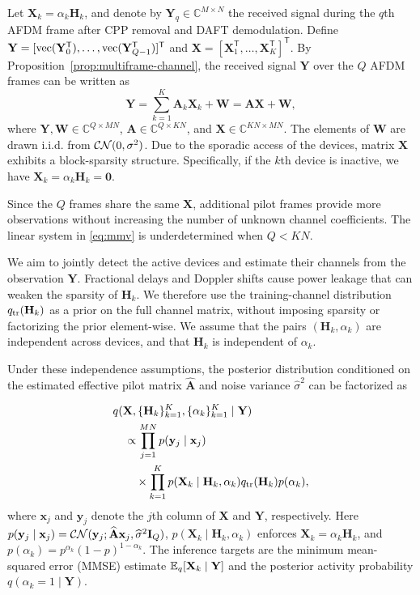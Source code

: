 Let $\mathbf X_k=\alpha_k\mathbf H_k$, and denote by
$\mathbf Y_q\in\mathbb C^{M\times N}$ the received signal during the
$q$th AFDM frame after CPP removal and DAFT demodulation. Define
$\mathbf Y=[\operatorname{vec}(\mathbf Y_0^{\mathsf T}),\ldots,
\operatorname{vec}(\mathbf Y_{Q-1}^{\mathsf T})]^{\mathsf T}$ and
$\mathbf X=[\mathbf X_1^{\mathsf T},\ldots,
\mathbf X_K^{\mathsf T}]^{\mathsf T}$. By
Proposition~\ref{prop:multiframe-channel}, the received signal $\mathbf Y$
over the $Q$ AFDM frames can be written as
\begin{equation}
 \mathbf Y=\sum_{k=1}^K\mathbf A_k\mathbf X_k+\mathbf W
 =\mathbf A\mathbf X+\mathbf W,
 \label{eq:mmv}
\end{equation}
where $\mathbf Y,\mathbf W\in\mathbb C^{Q\times MN}$,
$\mathbf A\in\mathbb C^{Q\times KN}$, and
$\mathbf X\in\mathbb C^{KN\times MN}$.
The elements of $\mathbf W$ are drawn i.i.d. from $\mathcal{CN}(0,\sigma^2)$.
Due to the sporadic access of the devices, matrix $\mathbf X$ exhibits
a block-sparsity structure. Specifically, if the $k$th device is
inactive, we have $\mathbf X_k=\alpha_k\mathbf H_k=\mathbf0$.

Since the $Q$ frames share the same $\mathbf X$, additional pilot frames
provide more observations without increasing the number of unknown
channel coefficients. The linear system in \eqref{eq:mmv} is
underdetermined when $Q<KN$.

We aim to jointly detect the active devices and estimate their channels
from the observation $\mathbf Y$. Fractional delays and Doppler
shifts cause power leakage that can weaken the sparsity of $\mathbf H_k$.
We therefore use the training-channel distribution
$q_{\rm tr}(\mathbf H_k)$ as a prior on the full channel matrix,
without imposing sparsity or factorizing the prior element-wise.
We assume that the pairs $(\mathbf H_k,\alpha_k)$ are independent
across devices, and that $\mathbf H_k$ is independent of $\alpha_k$.

Under these independence assumptions, the posterior distribution
conditioned on the estimated effective pilot matrix $\widehat{\mathbf A}$
and noise variance $\widehat\sigma^2$ can be factorized as

\begin{equation}
 \begin{aligned}
 &q(\mathbf X,\{\mathbf H_k\}_{k=1}^{K},\{\alpha_k\}_{k=1}^{K}\mid\mathbf Y)\\
 &\quad\propto\prod_{j=1}^{MN}p(\mathbf y_j\mid\mathbf x_j)\\
 &\qquad\times\prod_{k=1}^{K}
 p(\mathbf X_k\mid \mathbf H_k,\alpha_k)q_{\rm tr}(\mathbf H_k)p(\alpha_k),
 \end{aligned}
 \label{eq:working-posterior}
\end{equation}
where $\mathbf x_j$ and $\mathbf y_j$
denote the $j$th column of $\mathbf X$ and $\mathbf Y$, respectively.
Here
$p(\mathbf y_j\mid\mathbf x_j)=\mathcal{CN}(\mathbf y_j;
\widehat{\mathbf A}\mathbf x_j,\widehat\sigma^2\mathbf{I}_Q)$,
$p(\mathbf X_k\mid \mathbf H_k,\alpha_k)$ enforces $\mathbf X_k=\alpha_k\mathbf H_k$, and
$p(\alpha_k)=p^{\alpha_k}(1-p)^{1-\alpha_k}$.
The inference targets are the minimum mean-squared error (MMSE) estimate
$\mathbb{E}_q[\mathbf X_k\mid\mathbf Y]$ and the posterior activity probability
$q(\alpha_k=1\mid\mathbf Y)$.
